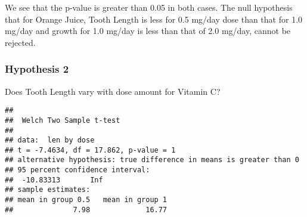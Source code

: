 \documentclass[
]{article}
\newenvironment{Shaded}{\begin{snugshade}}{\end{snugshade}}
\newcommand{\AttributeTok}[1]{\textcolor[rgb]{0.77,0.63,0.00}{#1}}
\newcommand{\CommentTok}[1]{\textcolor[rgb]{0.56,0.35,0.01}{\textit{#1}}}
\newcommand{\ConstantTok}[1]{\textcolor[rgb]{0.00,0.00,0.00}{#1}}
\newcommand{\FloatTok}[1]{\textcolor[rgb]{0.00,0.00,0.81}{#1}}
\newcommand{\FunctionTok}[1]{\textcolor[rgb]{0.00,0.00,0.00}{#1}}
\newcommand{\NormalTok}[1]{#1}
\newcommand{\OtherTok}[1]{\textcolor[rgb]{0.56,0.35,0.01}{#1}}
\newcommand{\SpecialCharTok}[1]{\textcolor[rgb]{0.00,0.00,0.00}{#1}}
\newcommand{\StringTok}[1]{\textcolor[rgb]{0.31,0.60,0.02}{#1}}
\begin{document}
We see that the p-value is greater than 0.05 in both cases. The null
hypothesis that for Orange Juice, Tooth Length is less for 0.5 mg/day
dose than that for 1.0 mg/day and growth for 1.0 mg/day is less than
that of 2.0 mg/day, cannot be rejected.

\hypertarget{hypothesis-2}{%
\subsubsection{Hypothesis 2}\label{hypothesis-2}}

Does Tooth Length vary with dose amount for Vitamin C?

\begin{Shaded}
\end{Shaded}

\begin{verbatim}
## 
##  Welch Two Sample t-test
## 
## data:  len by dose
## t = -7.4634, df = 17.862, p-value = 1
## alternative hypothesis: true difference in means is greater than 0
## 95 percent confidence interval:
##  -10.83313       Inf
## sample estimates:
## mean in group 0.5   mean in group 1 
##              7.98             16.77
\end{verbatim}

\begin{Shaded}
\end{Shaded}
\end{document}
